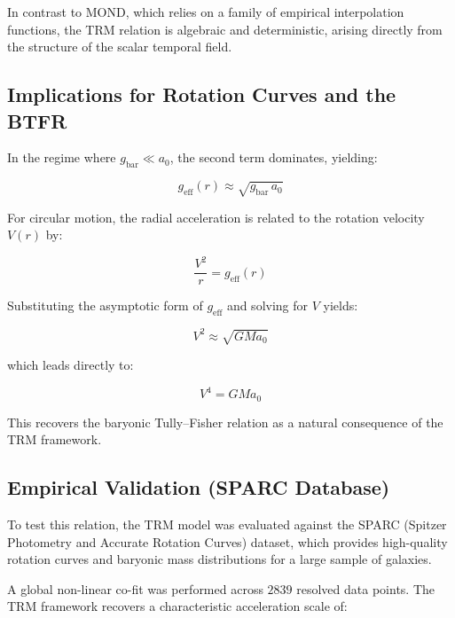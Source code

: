 \documentclass[11pt]{article}
\begin{document}
	In contrast to MOND, which relies on a family of empirical interpolation functions, the TRM relation is algebraic and deterministic, arising directly from the structure of the scalar temporal field.

	\subsection{Implications for Rotation Curves and the BTFR}

	In the regime where $g_{\mathrm{bar}} \ll a_0$, the second term dominates, yielding:

	\begin{equation}
		g_{\mathrm{eff}}(r) \approx \sqrt{g_{\mathrm{bar}}\, a_0}
	\end{equation}

	For circular motion, the radial acceleration is related to the rotation velocity $V(r)$ by:

	\begin{equation}
		\frac{V^2}{r} = g_{\mathrm{eff}}(r)
	\end{equation}

	Substituting the asymptotic form of $g_{\mathrm{eff}}$ and solving for $V$ yields:

	\begin{equation}
		V^2 \approx \sqrt{G M a_0}
	\end{equation}

	which leads directly to:

	\begin{equation}
		V^4 = G M a_0
	\end{equation}

	This recovers the baryonic Tully--Fisher relation as a natural consequence of the TRM framework.

	\subsection{Empirical Validation (SPARC Database)}

	To test this relation, the TRM model was evaluated against the SPARC (Spitzer Photometry and Accurate Rotation Curves) dataset, which provides high-quality rotation curves and baryonic mass distributions for a large sample of galaxies.

	A global non-linear co-fit was performed across $2839$ resolved data points. The TRM framework recovers a characteristic acceleration scale of:
\end{document}
